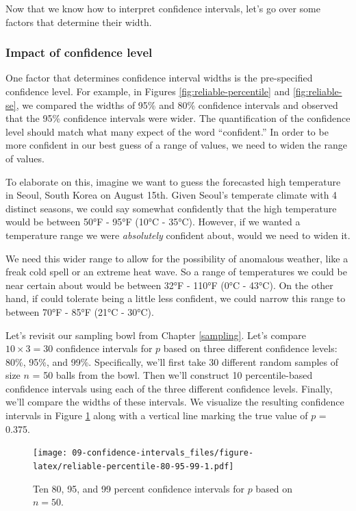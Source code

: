 \documentclass[
]{book}
\begin{document}
Now that we know how to interpret confidence intervals, let's go over some factors that determine their width.

\hypertarget{impact-of-confidence-level}{%
\subsubsection*{Impact of confidence level}\label{impact-of-confidence-level}}

One factor that determines confidence interval widths is the pre-specified confidence level. For example, in Figures \ref{fig:reliable-percentile} and \ref{fig:reliable-se}, we compared the widths of 95\% and 80\% confidence intervals and observed that the 95\% confidence intervals were wider. The quantification of the confidence level should match what many expect of the word ``confident.'' In order to be more confident in our best guess of a range of values, we need to widen the range of values.

To elaborate on this, imagine we want to guess the forecasted high temperature in Seoul, South Korea on August 15th. Given Seoul's temperate climate with 4 distinct seasons, we could say somewhat confidently that the high temperature would be between 50°F - 95°F (10°C - 35°C). However, if we wanted a temperature range we were \emph{absolutely} confident about, would we need to widen it.

We need this wider range to allow for the possibility of anomalous weather, like a freak cold spell or an extreme heat wave. So a range of temperatures we could be near certain about would be between 32°F - 110°F (0°C - 43°C). On the other hand, if could tolerate being a little less confident, we could narrow this range to between 70°F - 85°F (21°C - 30°C).

Let's revisit our sampling bowl from Chapter \ref{sampling}. Let's compare \(10 \times 3 = 30\) confidence intervals for \(p\) based on three different confidence levels: 80\%, 95\%, and 99\%. Specifically, we'll first take 30 different random samples of size \(n\) = 50 balls from the bowl. Then we'll construct 10 percentile-based confidence intervals using each of the three different confidence levels. Finally, we'll compare the widths of these intervals. We visualize the resulting confidence intervals in Figure \ref{fig:reliable-percentile-80-95-99} along with a vertical line marking the true value of \(p\) = 0.375.

\begin{figure}
\centering
\texttt{[image: 09-confidence-intervals\_files/figure-latex/reliable-percentile-80-95-99-1.pdf]}
\caption{\label{fig:reliable-percentile-80-95-99}Ten 80, 95, and 99 percent confidence intervals for \(p\) based on \(n = 50\).}
\end{figure}
\end{document}

